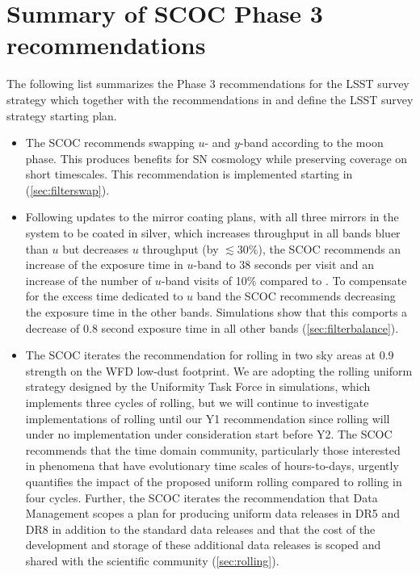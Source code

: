 \section{Summary of SCOC Phase 3 recommendations}\label{sec:summary}
The following list summarizes the Phase 3 recommendations for the LSST survey strategy which together with the recommendations in  and  define the LSST survey strategy starting plan. 

\begin{itemize}
\item The SCOC recommends swapping $u$- and $y$-band according to the moon phase. This produces benefits for SN cosmology while preserving coverage on short timescales. This recommendation is implemented starting in (\autoref{sec:filterswap}).




\item Following updates to the mirror coating plans, with all three mirrors in the system to be coated in silver, which increases throughput in all bands bluer than $u$ but decreases $u$ throughput (by $\lesssim30\%$), the SCOC recommends an increase of the exposure time in $u$-band to 38 seconds per visit and an increase of the number of $u$-band visits of 10\% compared to . To compensate for the excess time dedicated to $u$ band the SCOC recommends decreasing the exposure time in the other bands. Simulations show that this comports a decrease of 0.8 second exposure time in all other bands (\autoref{sec:filterbalance}).

\item {The SCOC iterates the recommendation for rolling in two sky areas at 0.9 strength on the WFD low-dust footprint. We are adopting the rolling uniform strategy designed by the Uniformity Task Force in  simulations, which implements three cycles of rolling, but we will continue to investigate implementations of rolling until our Y1 recommendation since rolling will under no implementation under consideration start before Y2.  The SCOC recommends that the time domain community, particularly those interested in phenomena that have evolutionary time scales of hours-to-days, urgently quantifies the impact of the proposed uniform rolling compared to rolling in four cycles. Further, the SCOC iterates the recommendation that Data Management scopes a plan for producing uniform data releases in DR5 and DR8 in addition to the standard data releases and that the cost of the development and storage of these additional data releases is scoped and shared with the scientific community (\autoref{sec:rolling}).} 


\end{itemize}
